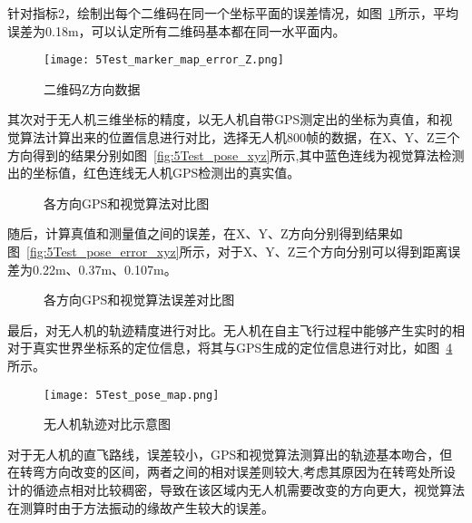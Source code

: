 针对指标2，绘制出每个二维码在同一个坐标平面的误差情况，如图~\ref{fig:5Test_marker_map_error_Z}所示，平均误差为0.18m，可以认定所有二维码基本都在同一水平面内。
\begin{figure}[H] %
  \centering
  \texttt{[image: 5Test\_marker\_map\_error\_Z.png]}
  \caption{二维码Z方向数据}
  \label{fig:5Test_marker_map_error_Z}
\end{figure}
其次对于无人机三维坐标的精度，以无人机自带GPS测定出的坐标为真值，和视觉算法计算出来的位置信息进行对比，选择无人机800帧的数据，在X、Y、Z三个方向得到的结果分别如图~\ref{fig:5Test_pose_xyz}所示,其中蓝色连线为视觉算法检测出的坐标值，红色连线无人机GPS检测出的真实值。
\begin{figure}[h]
  \centering
  \vskip0.5cm
  \caption{各方向GPS和视觉算法对比图}\label{fig:chap2:pose_xyz}
\end{figure}
随后，计算真值和测量值之间的误差，在X、Y、Z方向分别得到结果如图~\ref{fig:5Test_pose_error_xyz}所示，对于X、Y、Z三个方向分别可以得到距离误差为0.22m、0.37m、0.107m。
\begin{figure}[H]
    \centering
    \vskip0.5cm
    \vskip0.5cm
    \caption{各方向GPS和视觉算法误差对比图}\label{fig:chap2:pose_error_xyz}
\end{figure}
最后，对无人机的轨迹精度进行对比。无人机在自主飞行过程中能够产生实时的相对于真实世界坐标系的定位信息，将其与GPS生成的定位信息进行对比，如图~\ref{fig:5Test_pose_map}所示。
\begin{figure}[H] %
  \centering
  \texttt{[image: 5Test\_pose\_map.png]}
  \caption{无人机轨迹对比示意图}
  \label{fig:5Test_pose_map}
\end{figure}
对于无人机的直飞路线，误差较小，GPS和视觉算法测算出的轨迹基本吻合，但在转弯方向改变的区间，两者之间的相对误差则较大,考虑其原因为在转弯处所设计的循迹点相对比较稠密，导致在该区域内无人机需要改变的方向更大，视觉算法在测算时由于方法振动的缘故产生较大的误差。
